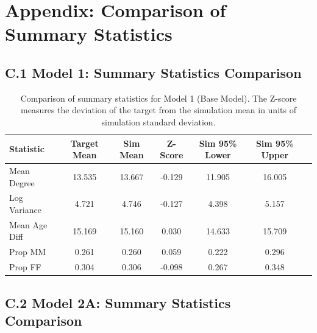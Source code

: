 \clearpage


\section*{Appendix: Comparison of Summary Statistics}
\label{sec:appendix_stats_comparison}


\subsection*{C.1 Model 1: Summary Statistics Comparison}

\begin{table}[htbp]
    \centering
    \caption{Comparison of summary statistics for Model 1 (Base Model). The Z-score measures the deviation of the target from the simulation mean in units of simulation standard deviation.}
    \label{tab:stats_m1}
    \small
    \begin{tabular}{lcccccc}
        \toprule
        Statistic & Target Mean & Sim Mean & Z-Score & Sim 95\% Lower & Sim 95\% Upper \\
        \midrule
        Mean Degree   & 13.535 & 13.667 & -0.129 & 11.905 & 16.005 \\
        Log Variance  & 4.721  & 4.746  & -0.127 & 4.398  & 5.157 \\
        Mean Age Diff & 15.169 & 15.160 & 0.030  & 14.633 & 15.709 \\
        Prop MM       & 0.261  & 0.260  & 0.059  & 0.222  & 0.296 \\
        Prop FF       & 0.304  & 0.306  & -0.098 & 0.267  & 0.348 \\
        \bottomrule
    \end{tabular}
\end{table}

\subsection*{C.2 Model 2A: Summary Statistics Comparison}


